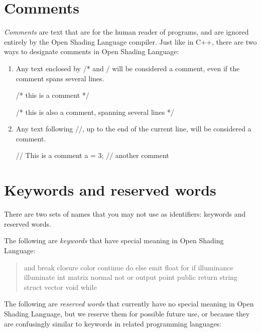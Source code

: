 \documentclass[11pt,letterpaper]{book}
\def\langname{Open Shading Language\xspace}
\begin{document}
\section{Comments}
\label{sec:comments}

\emph{Comments} are text that are for the human reader of programs, and
are ignored entirely by the \langname compiler.  Just like in C++, there
are two ways to designate comments in \langname:

\begin{enumerate}
\item Any text enclosed by {\cf /*} and {\cf */} will be considered
a comment, even if the comment spans several lines.

\begin{code}
    /* this is a comment */

    /* this is also
       a comment, spanning
       several lines */
\end{code}

\item Any text following {\cf //}, up to the end of the current line,
will be considered a comment.

\begin{code}
    // This is a comment
    a = 3;   // another comment
\end{code}
\end{enumerate}


\section{Keywords and reserved words}
\label{sec:lexical:keyreserved}

There are two sets of names that you may not use as identifiers:
keywords and reserved words.

The following are \emph{keywords} that have special meaning in
\langname: 

\begin{quote} {\cf

and break closure color continue do else emit float for if illuminance
illuminate int matrix normal not or output point public return string struct
vector void while

}
\end{quote}

The following are \emph{reserved words} that currently have no special
meaning in \langname, but we reserve them for possible future use, or
because they are confusingly similar to keywords in related programming
languages: 
\end{document}
